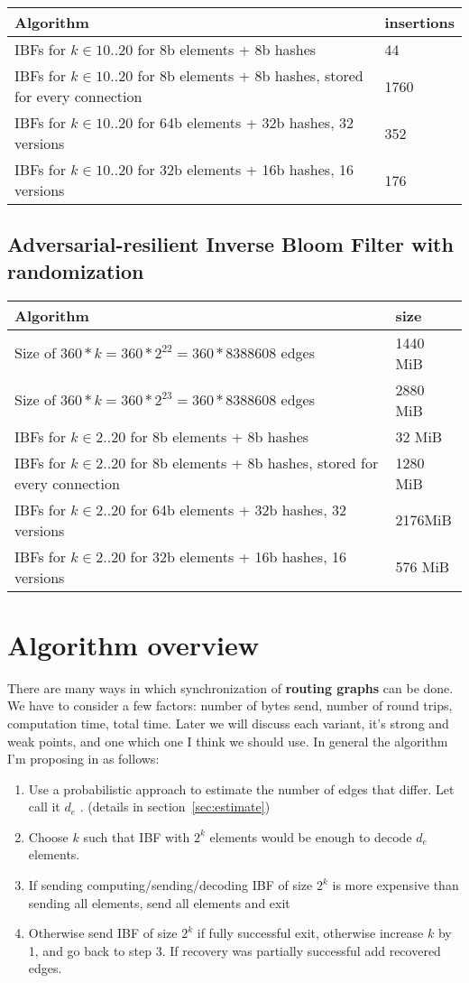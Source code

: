\documentclass[11pt]{article}
\begin{document}
\begin{tabular}{ | l | l | }
    \hline
    Algorithm & insertions \\ \hline
    IBFs for $k \in 10..20$ for 8b elements + 8b hashes & 44  \\
    IBFs for $k \in 10..20$ for 8b elements + 8b hashes, stored for every connection & 1760  \\
    IBFs for $k \in 10..20$ for 64b elements + 32b hashes, 32 versions & 352 \\
    IBFs for $k \in 10..20$ for 32b elements + 16b hashes, 16 versions & 176 \\ \hline
\end{tabular}


\subsection{Adversarial-resilient Inverse Bloom Filter with randomization}

\begin{tabular}{ | l | l | }
    \hline
    Algorithm & size \\ \hline
    Size of  $360 * k  = 360 * 2^{22} = 360 * 8388608$ edges & 1440 MiB \\
    Size of  $360 * k  = 360 * 2^{23} = 360 * 8388608$ edges & 2880 MiB \\
    IBFs for $k \in 2..20$ for 8b elements + 8b hashes & 32 MiB \\
    IBFs for $k \in 2..20$ for 8b elements + 8b hashes, stored for every connection & 1280 MiB  \\
    IBFs for $k \in 2..20$ for 64b elements + 32b hashes, 32 versions & 2176MiB  \\
    IBFs for $k \in 2..20$ for 32b elements + 16b hashes, 16 versions & 576 MiB  \\ \hline
\end{tabular}


\section{Algorithm overview}
There are many ways in which synchronization of \textbf{routing graphs} can be done.
We have to consider a few factors: number of bytes send, number of round trips, computation time, total time.
Later we will discuss each variant, it's strong and weak points, and one which one I think we should use.
In general the algorithm I'm proposing in as follows:
\begin{enumerate}
  \item Use a probabilistic approach to estimate the number of edges that differ.
  Let call it $d_e$ . (details in section~\ref{sec:estimate})
  \item Choose $k$ such that IBF with $2^k$ elements would be enough to decode $d_e$ elements.
  \item If sending computing/sending/decoding IBF of size $2^k$ is more expensive than sending all elements, send all elements and exit
  \item Otherwise send IBF of size $2^k$ if fully successful exit, otherwise increase $k$ by 1, and go back to step 3.
 If recovery was partially successful add recovered edges.
\end{enumerate}
\end{document}

